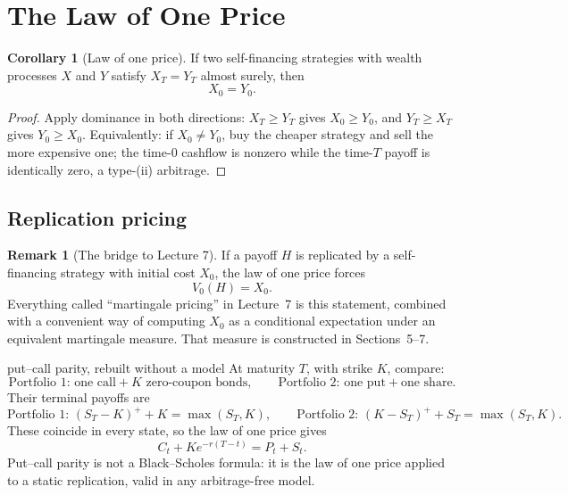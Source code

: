 \documentclass[10pt]{article}
\newcommand{\1}{\mathbf 1}
\theoremstyle{definition}
\newtheorem{corollary}[definition]{Corollary}
\newtheorem{remark}[definition]{Remark}
\begin{document}
\section{The Law of One Price}

\begin{corollary}[Law of one price]
If two self-financing strategies with wealth processes \(X\) and \(Y\)
satisfy \(X_T=Y_T\) almost surely, then
\[
\boxed{X_0=Y_0.}
\]
\end{corollary}

\begin{proof}
Apply dominance in both directions: \(X_T\geq Y_T\) gives \(X_0\geq Y_0\),
and \(Y_T\geq X_T\) gives \(Y_0\geq X_0\). Equivalently: if \(X_0\neq Y_0\),
buy the cheaper strategy and sell the more expensive one; the time-\(0\)
cashflow is nonzero while the time-\(T\) payoff is identically zero, a
type-(ii) arbitrage.
\end{proof}

\subsection{Replication pricing}

\begin{remark}[The bridge to Lecture 7]
If a payoff \(H\) is replicated by a self-financing strategy with initial
cost \(X_0\), the law of one price forces
\[
\boxed{V_0(H)=X_0.}
\]
Everything called ``martingale pricing'' in Lecture~7 is this statement,
combined with a convenient way of computing \(X_0\) as a conditional
expectation under an equivalent martingale measure. That measure is
constructed in Sections~5--7.
\end{remark}

\begin{boardexample}{put--call parity, rebuilt without a model}
At maturity \(T\), with strike \(K\), compare:
\[
\text{Portfolio 1: one call}+K\text{ zero-coupon bonds},
\qquad
\text{Portfolio 2: one put}+\text{one share}.
\]
Their terminal payoffs are
\[
\text{Portfolio 1: }(S_T-K)^++K=\max(S_T,K),
\qquad
\text{Portfolio 2: }(K-S_T)^++S_T=\max(S_T,K).
\]
These coincide in every state, so the law of one price gives
\[
\boxed{C_t+Ke^{-r(T-t)}=P_t+S_t.}
\]
Put--call parity is not a Black--Scholes formula: it is the law of one price
applied to a static replication, valid in any arbitrage-free model.
\end{boardexample}
\end{document}
